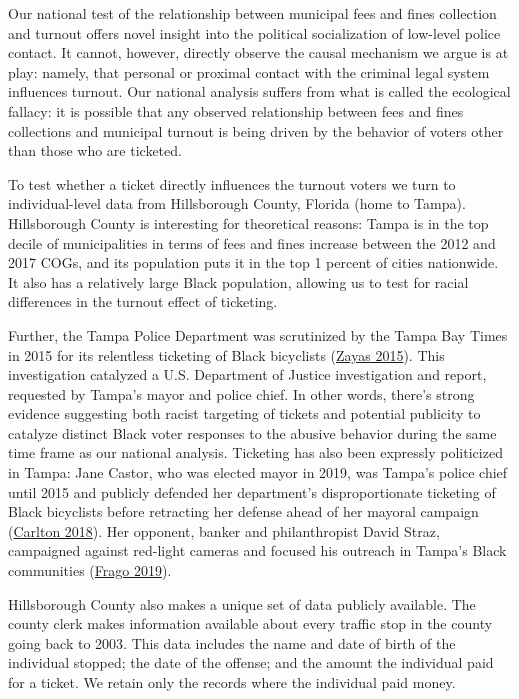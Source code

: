 \documentclass[
  12pt,
]{article}
\begin{document}
Our national test of the relationship between municipal fees and fines collection and turnout offers novel insight into the political socialization of low-level police contact. It cannot, however, directly observe the causal mechanism we argue is at play: namely, that personal or proximal contact with the criminal legal system influences turnout. Our national analysis suffers from what is called the ecological fallacy: it is possible that any observed relationship between fees and fines collections and municipal turnout is being driven by the behavior of voters other than those who are ticketed.

To test whether a ticket directly influences the turnout voters we turn to individual-level data from Hillsborough County, Florida (home to Tampa). Hillsborough County is interesting for theoretical reasons: Tampa is in the top decile of municipalities in terms of fees and fines increase between the 2012 and 2017 COGs, and its population puts it in the top 1 percent of cities nationwide. It also has a relatively large Black population, allowing us to test for racial differences in the turnout effect of ticketing.

Further, the Tampa Police Department was scrutinized by the Tampa Bay Times in 2015 for its relentless ticketing of Black bicyclists (\protect\hyperlink{ref-Zayas2015}{Zayas 2015}). This investigation catalyzed a U.S. Department of Justice investigation and report, requested by Tampa's mayor and police chief. In other words, there's strong evidence suggesting both racist targeting of tickets and potential publicity to catalyze distinct Black voter responses to the abusive behavior during the same time frame as our national analysis. Ticketing has also been expressly politicized in Tampa: Jane Castor, who was elected mayor in 2019, was Tampa's police chief until 2015 and publicly defended her department's disproportionate ticketing of Black bicyclists before retracting her defense ahead of her mayoral campaign (\protect\hyperlink{ref-Carlton2018}{Carlton 2018}). Her opponent, banker and philanthropist David Straz, campaigned against red-light cameras and focused his outreach in Tampa's Black communities (\protect\hyperlink{ref-Frago2019}{Frago 2019}).

Hillsborough County also makes a unique set of data publicly available. The county clerk makes information available about every traffic stop in the county going back to 2003. This data includes the name and date of birth of the individual stopped; the date of the offense; and the amount the individual paid for a ticket. We retain only the records where the individual paid money.
\end{document}
